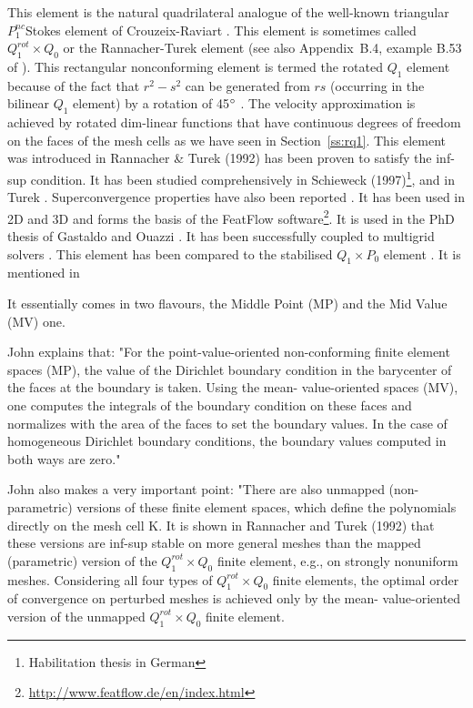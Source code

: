
This element is the natural quadrilateral analogue
of the well-known triangular $P_1^{nc} $Stokes element of Crouzeix-Raviart \cite{crra73}.
This element is sometimes called $Q_1^{rot} \times Q_0$ or the Rannacher-Turek element 
\cite[Section 3.6.5]{john16} (see also Appendix~B.4, example B.53 of \textcite{john16}).
This rectangular nonconforming \cite{crfa89} element is termed the rotated $Q_1$ element 
because of the fact that $r^2-s^2$ can be generated from $rs$ (occurring in the bilinear $Q_1$ 
element) by a rotation of 45$\degree$ \cite[p93]{chen}.
The velocity approximation is achieved by rotated dim-linear functions that have 
continuous degrees of freedom on
the faces of the mesh cells as we have seen in Section~\ref{ss:rq1}.
This element was introduced in Rannacher \& Turek (1992) \cite{ratu92} 
has been proven to satisfy the inf-sup condition. It has been studied comprehensively in Schieweck 
(1997)\footnote{Habilitation thesis in German}, \cite{shzh06} and in Turek \cite{ture94,ture96}.
Superconvergence properties have also been reported \cite{misx06,misx07}.
It has been used in 2D \cite{maky17} and 3D \cite{klll96,gekm08} and forms the basis of the FeatFlow 
software\footnote{\url{http://www.featflow.de/en/index.html}}. 
It is used in the PhD thesis of Gastaldo \cite{gast07} and Ouazzi \cite{ouaz05}.
It has been 
successfully coupled to multigrid solvers \cite{chos98,tuos02}.
This element has been compared to the stabilised $Q_1\times P_0$ element \cite{lisi13}.
It is mentioned in \cite{hans11}

It essentially comes in two flavours, the Middle Point (MP) and the Mid Value (MV) one.

\begin{remark} 
John \cite{john16} explains that: "For the point-value-oriented non-conforming finite element spaces (MP), 
the value of the Dirichlet boundary
condition in the barycenter of the faces at the boundary is taken. Using the mean-
value-oriented spaces (MV), one computes the integrals of the boundary condition on
these faces and normalizes with the area of the faces to set the boundary values.
In the case of homogeneous Dirichlet boundary conditions, the boundary values
computed in both ways are zero."
\end{remark}

\begin{remark} 
John also makes a very important point: "There are also unmapped (non-parametric) versions of 
these finite element spaces, which define the polynomials directly on the mesh cell K. It is shown in Rannacher
and Turek (1992) \cite{ratu92} that these versions are inf-sup stable on more general meshes than
the mapped (parametric) version of the $Q_1^{rot}\times Q_0$ finite element, e.g., on strongly
nonuniform meshes. Considering all four types of $Q_1^{rot}\times Q_0$ finite elements, the
optimal order of convergence on perturbed meshes is achieved only by the mean-
value-oriented version of the unmapped $Q_1^{rot}\times Q_0$   finite element.
\end{remark}

